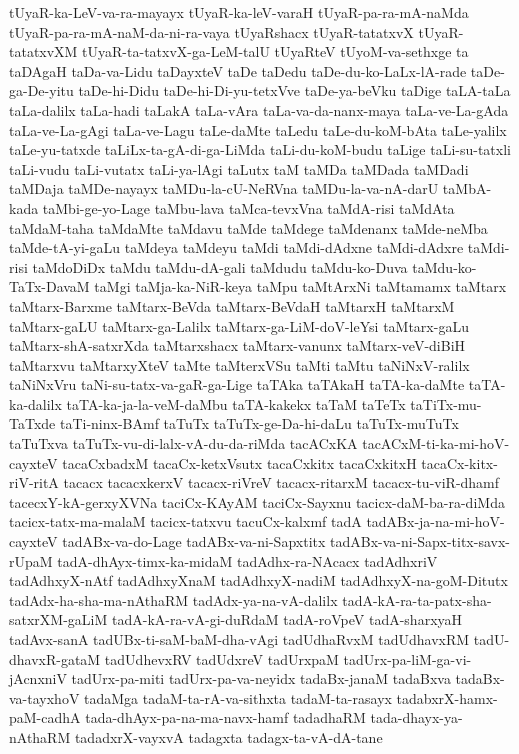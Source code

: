 {tUyaR-ka-LeV-va-ra-mayayx
tUyaR-ka-leV-varaH
tUyaR-pa-ra-mA-naMda
tUyaR-pa-ra-mA-naM-da-ni-ra-vaya
tUyaRshacx
tUyaR-tatatxvX
tUyaR-tatatxvXM
tUyaR-ta-tatxvX-ga-LeM-talU
tUyaRteV
tUyoM-va-sethxge
ta
taDAgaH
taDa-va-Lidu
taDayxteV
taDe
taDedu
taDe-du-ko-LaLx-lA-rade
taDe-ga-De-yitu
taDe-hi-Didu
taDe-hi-Di-yu-tetxVve
taDe-ya-beVku
taDige
taLA-taLa
taLa-dalilx
taLa-hadi
taLakA
taLa-vAra
taLa-va-da-nanx-maya
taLa-ve-La-gAda
taLa-ve-La-gAgi
taLa-ve-Lagu
taLe-daMte
taLedu
taLe-du-koM-bAta
taLe-yalilx
taLe-yu-tatxde
taLiLx-ta-gA-di-ga-LiMda
taLi-du-koM-budu
taLige
taLi-su-tatxli
taLi-vudu
taLi-vutatx
taLi-ya-lAgi
taLutx
taM
taMDa
taMDada
taMDadi
taMDaja
taMDe-nayayx
taMDu-la-cU-NeRVna
taMDu-la-va-nA-darU
taMbA-kada
taMbi-ge-yo-Lage
taMbu-lava
taMca-tevxVna
taMdA-risi
taMdAta
taMdaM-taha
taMdaMte
taMdavu
taMde
taMdege
taMdenanx
taMde-neMba
taMde-tA-yi-gaLu
taMdeya
taMdeyu
taMdi
taMdi-dAdxne
taMdi-dAdxre
taMdi-risi
taMdoDiDx
taMdu
taMdu-dA-gali
taMdudu
taMdu-ko-Duva
taMdu-ko-TaTx-DavaM
taMgi
taMja-ka-NiR-keya
taMpu
taMtArxNi
taMtamamx
taMtarx
taMtarx-Barxme
taMtarx-BeVda
taMtarx-BeVdaH
taMtarxH
taMtarxM
taMtarx-gaLU
taMtarx-ga-Lalilx
taMtarx-ga-LiM-doV-leYsi
taMtarx-gaLu
taMtarx-shA-satxrXda
taMtarxshacx
taMtarx-vanunx
taMtarx-veV-diBiH
taMtarxvu
taMtarxyXteV
taMte
taMterxVSu
taMti
taMtu
taNiNxV-ralilx
taNiNxVru
taNi-su-tatx-va-gaR-ga-Lige
taTAka
taTAkaH
taTA-ka-daMte
taTA-ka-dalilx
taTA-ka-ja-la-veM-daMbu
taTA-kakekx
taTaM
taTeTx
taTiTx-mu-TaTxde
taTi-ninx-BAmf
taTuTx
taTuTx-ge-Da-hi-daLu
taTuTx-muTuTx
taTuTxva
taTuTx-vu-di-lalx-vA-du-da-riMda
tacACxKA
tacACxM-ti-ka-mi-hoV-cayxteV
tacaCxbadxM
tacaCx-ketxVsutx
tacaCxkitx
tacaCxkitxH
tacaCx-kitx-riV-ritA
tacacx
tacacxkerxV
tacacx-riVreV
tacacx-ritarxM
tacacx-tu-viR-dhamf
tacecxY-kA-gerxyXVNa
taciCx-KAyAM
taciCx-Sayxnu
tacicx-daM-ba-ra-diMda
tacicx-tatx-ma-malaM
tacicx-tatxvu
tacuCx-kalxmf
tadA
tadABx-ja-na-mi-hoV-cayxteV
tadABx-va-do-Lage
tadABx-va-ni-Sapxtitx
tadABx-va-ni-Sapx-titx-savx-rUpaM
tadA-dhAyx-timx-ka-midaM
tadAdhx-ra-NAcacx
tadAdhxriV
tadAdhxyX-nAtf
tadAdhxyXnaM
tadAdhxyX-nadiM
tadAdhxyX-na-goM-Ditutx
tadAdx-ha-sha-ma-nAthaRM
tadAdx-ya-na-vA-dalilx
tadA-kA-ra-ta-patx-sha-satxrXM-gaLiM
tadA-kA-ra-vA-gi-duRdaM
tadA-roVpeV
tadA-sharxyaH
tadAvx-sanA
tadUBx-ti-saM-baM-dha-vAgi
tadUdhaRvxM
tadUdhavxRM
tadU-dhavxR-gataM
tadUdhevxRV
tadUdxreV
tadUrxpaM
tadUrx-pa-liM-ga-vi-jAcnxniV
tadUrx-pa-miti
tadUrx-pa-va-neyidx
tadaBx-janaM
tadaBxva
tadaBx-va-tayxhoV
tadaMga
tadaM-ta-rA-va-sithxta
tadaM-ta-rasayx
tadabxrX-hamx-paM-cadhA
tada-dhAyx-pa-na-ma-navx-hamf
tadadhaRM
tada-dhayx-ya-nAthaRM
tadadxrX-vayxvA
tadagxta
tadagx-ta-vA-dA-tane
}

